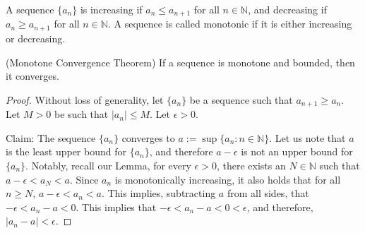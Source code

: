 \documentclass{ximera}
\begin{document}
\begin{definition}
    A sequence $\{a_n\}$ is increasing if $a_n \leq a_{n+1}$ for all $n \in \mathbb{N}$, and decreasing if $a_n \geq a_{n+1}$ for all $n \in \mathbb{N}$.  A sequence is called monotonic if it is either increasing or decreasing.
\end{definition}

\begin{theorem}{(Monotone Convergence Theorem)}
    If a sequence is monotone and bounded, then it converges.
\end{theorem}

\begin{proof}
    Without loss of generality, let $\{a_n\}$ be a sequence such that $a_{n+1} \geq a_n$.  Let $M > 0$ be such that $|a_n| \leq M$.  Let $\epsilon >0$.

    Claim: The sequence $\{a_n\}$ converges to $a:=\sup\{a_n: n\in\mathbb{N}\}$.
    Let us note that $a$ is the least upper bound for $\{a_n\}$, and therefore $a-\epsilon$ is not an upper bound for $\{a_n\}$.  Notably, recall our Lemma, for every $\epsilon >0$, there exists an $N \in \mathbb{N}$ such that $a-\epsilon < a_N < a$.  Since $a_n$ is monotonically increasing, it also holds that for all $n \geq N$, $a-\epsilon < a_n < a$.  This implies, subtracting $a$ from all sides, that $-\epsilon < a_n - a < 0$.  This implies that $-\epsilon < a_n - a < 0 < \epsilon$, and therefore, $|a_n-a| < \epsilon$.
\end{proof}
\end{document}
